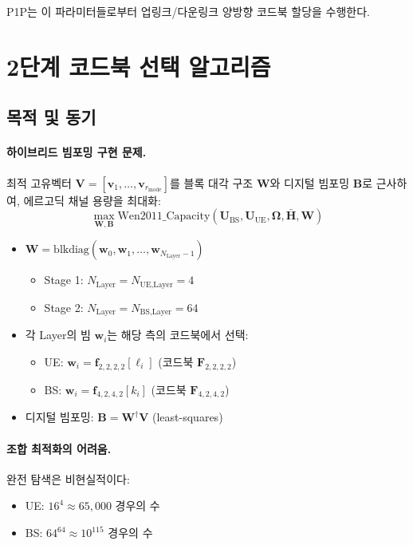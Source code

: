 \documentclass[10pt]{article}
\begin{document}
P1P는 이 파라미터들로부터 업링크/다운링크 양방향 코드북 할당을 수행한다.

\section{2단계 코드북 선택 알고리즘}

\subsection{목적 및 동기}

\paragraph{하이브리드 빔포밍 구현 문제.}
최적 고유벡터 $\mathbf{V} = [\mathbf{v}_1, \ldots, \mathbf{v}_{r_{\text{mode}}}]$를 블록 대각 구조 $\mathbf{W}$와 디지털 빔포밍 $\mathbf{B}$로 근사하여, 에르고딕 채널 용량을 최대화:
\begin{equation}
\max_{\mathbf{W}, \mathbf{B}} \text{Wen2011\_Capacity}(\mathbf{U}_{\text{BS}}, \mathbf{U}_{\text{UE}}, \boldsymbol{\Omega}, \bar{\mathbf{H}}, \mathbf{W})
\end{equation}

\begin{itemize}
    \item $\mathbf{W} = \text{blkdiag}(\mathbf{w}_0, \mathbf{w}_1, \ldots, \mathbf{w}_{N_{\text{Layer}}-1})$
    \begin{itemize}
        \item Stage 1: $N_{\text{Layer}} = N_{\text{UE,Layer}} = 4$
        \item Stage 2: $N_{\text{Layer}} = N_{\text{BS,Layer}} = 64$
    \end{itemize}
    \item 각 Layer의 빔 $\mathbf{w}_i$는 해당 측의 코드북에서 선택:
    \begin{itemize}
        \item UE: $\mathbf{w}_i = \mathbf{f}_{2,2,2,2}[\ell_i]$ (코드북 $\mathbf{F}_{2,2,2,2}$)
        \item BS: $\mathbf{w}_i = \mathbf{f}_{4,2,4,2}[k_i]$ (코드북 $\mathbf{F}_{4,2,4,2}$)
    \end{itemize}
    \item 디지털 빔포밍: $\mathbf{B} = \mathbf{W}^{\dagger} \mathbf{V}$ (least-squares)
\end{itemize}

\paragraph{조합 최적화의 어려움.}
완전 탐색은 비현실적이다:
\begin{itemize}
    \item UE: $16^4 \approx 65,000$ 경우의 수
    \item BS: $64^{64} \approx 10^{115}$ 경우의 수
\end{itemize}
\end{document}
